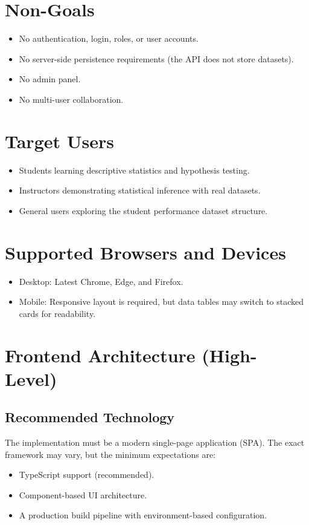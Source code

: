\documentclass[12pt,a4paper]{article}
\begin{document}
\section{Non-Goals}

\begin{itemize}
    \item No authentication, login, roles, or user accounts.
    \item No server-side persistence requirements (the API does not store datasets).
    \item No admin panel.
    \item No multi-user collaboration.
\end{itemize}

\section{Target Users}

\begin{itemize}
    \item Students learning descriptive statistics and hypothesis testing.
    \item Instructors demonstrating statistical inference with real datasets.
    \item General users exploring the student performance dataset structure.
\end{itemize}

\section{Supported Browsers and Devices}

\begin{itemize}
    \item Desktop: Latest Chrome, Edge, and Firefox.
    \item Mobile: Responsive layout is required, but data tables may switch to stacked cards for readability.
\end{itemize}

\section{Frontend Architecture (High-Level)}

\subsection{Recommended Technology}

The implementation must be a modern single-page application (SPA). The exact framework may vary, but the minimum expectations are:
\begin{itemize}
    \item TypeScript support (recommended).
    \item Component-based UI architecture.
    \item A production build pipeline with environment-based configuration.
\end{itemize}
\end{document}
